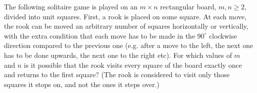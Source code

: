 The following solitaire game is played on an $m\times n$ rectangular board, $m,n\ge 2$,  divided into unit squares. First, a rook is placed on some square. At each move, the rook can be moved an arbitrary number of squares horizontally or vertically, with the extra condition that each move has to be made in the $90^{\circ}$ clockwise direction compared to the previous one (e.g. after a move to the left, the next one has to be done upwards, the next one to the right etc). For which values of $m$ and $n$ is it possible that the rook visits every square of the board exactly once and returns to the first square? (The rook is considered to visit only those squares it stops on, and not the ones it steps over.)